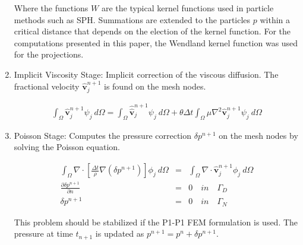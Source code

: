 \begin{enumerate}
Where the functions $W$ are the typical kernel functions used in particle methods such as SPH\cite{Mon77}. Summations are extended to the particles $p$ within a critical distance that depends on the election of the kernel function. For the computations presented in this paper, the Wendland kernel function\cite{Wendland} was used for the projections.

  \item Implicit Viscosity Stage: Implicit correction of the viscous diffusion. The fractional velocity $\widehat{\mathbf{v}}^{n+1}_{j}$ is found on the mesh nodes.

 \begin{eqnarray}\label{Step4a}
\displaystyle \int_{\Omega} \widehat{\mathbf{v}}^{n+1}_{j}\psi_j\ d\Omega =\int_{\Omega} \widehat{\widehat{\mathbf{v}}}^{n+1}_{j}\psi_j\  d\Omega + \theta \Delta t \int_{\Omega} \mu \nabla^{2}\widehat{\mathbf{v}}^{n+1}_{j} \psi_j\ d\Omega
\end{eqnarray}


 \item Poisson Stage: Computes the pressure correction $\delta p^{n+1}$ on the mesh nodes by solving the Poisson equation.


 \begin{eqnarray}\label{Step5a}
   \int_{\Omega} \nabla \cdot \left[\frac{\Delta t}{\rho}\nabla(\delta p^{n+1})\right] \phi_j\ d\Omega &=& \int_{\Omega} \nabla \cdot \widehat{\mathbf{v}}_j^{n+1} \phi_j\ d\Omega \\
   \frac{\partial \delta p^{n+1}}{\partial n} &=& 0 \quad in \quad \Gamma_D \\
   \delta p^{n+1} &=& 0 \quad in \quad \Gamma_N
 \end{eqnarray}

 This problem should be stabilized if the P1-P1 FEM formulation is used\cite{Idelsohn12b}. The pressure at time $t_{n+1}$ is updated as $p^{n+1}=p^{n}+\delta p^{n+1}$.



\end{enumerate}

